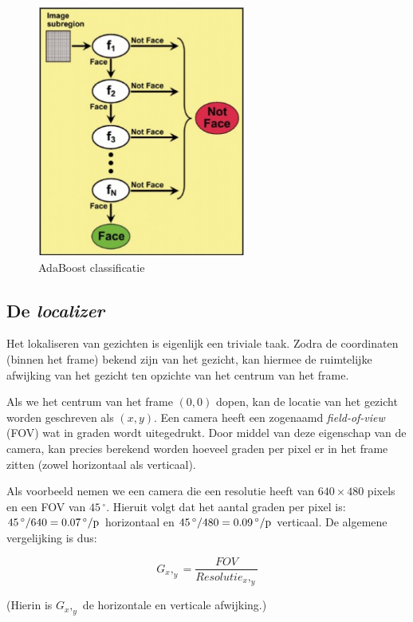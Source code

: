 \begin{figure}[H]
    \begin{center}
        \includegraphics[scale=0.75]{figures/adaboost-classification.png}
        \caption{AdaBoost classificatie}
    \end{center}
\end{figure}

\subsection{De \emph{localizer}}

Het lokaliseren van gezichten is eigenlijk een triviale taak. Zodra de coordinaten
(binnen het frame) bekend zijn van het gezicht, kan hiermee de ruimtelijke
afwijking van het gezicht ten opzichte van het centrum van het frame.

Als we het centrum van het frame $(0, 0)$ dopen, kan de locatie van het gezicht
worden geschreven als $(x, y)$. Een camera heeft een zogenaamd
\emph{field-of-view} (FOV) wat in graden wordt uitegedrukt. Door middel van deze
eigenschap van de camera, kan precies berekend worden hoeveel graden per pixel
er in het frame zitten (zowel horizontaal als verticaal).

Als voorbeeld nemen we een camera die een resolutie heeft van $640 \times 480$
pixels en een FOV van $45\,^{\circ}$. Hieruit volgt dat het aantal graden per pixel
is: $45\,^{\circ} / 640 = 0.07{\rm \,^{\circ}/p}$ horizontaal en
$45\,^{\circ} / 480 = 0.09{\rm \,^{\circ}/p}$ verticaal. De algemene vergelijking
is dus:

\begin{equation}
    G_x,_y = \frac{FOV}{Resolutie_x,_y}
\end{equation}

(Hierin is $G_x,_y$ de horizontale en verticale afwijking.)

